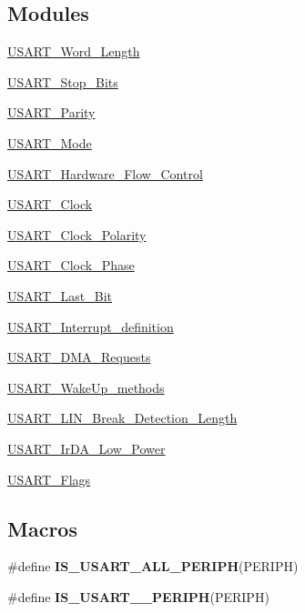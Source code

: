 \subsection*{Modules}
\begin{DoxyCompactItemize}
\item 
\hyperlink{group___u_s_a_r_t___word___length}{U\+S\+A\+R\+T\+\_\+\+Word\+\_\+\+Length}
\item 
\hyperlink{group___u_s_a_r_t___stop___bits}{U\+S\+A\+R\+T\+\_\+\+Stop\+\_\+\+Bits}
\item 
\hyperlink{group___u_s_a_r_t___parity}{U\+S\+A\+R\+T\+\_\+\+Parity}
\item 
\hyperlink{group___u_s_a_r_t___mode}{U\+S\+A\+R\+T\+\_\+\+Mode}
\item 
\hyperlink{group___u_s_a_r_t___hardware___flow___control}{U\+S\+A\+R\+T\+\_\+\+Hardware\+\_\+\+Flow\+\_\+\+Control}
\item 
\hyperlink{group___u_s_a_r_t___clock}{U\+S\+A\+R\+T\+\_\+\+Clock}
\item 
\hyperlink{group___u_s_a_r_t___clock___polarity}{U\+S\+A\+R\+T\+\_\+\+Clock\+\_\+\+Polarity}
\item 
\hyperlink{group___u_s_a_r_t___clock___phase}{U\+S\+A\+R\+T\+\_\+\+Clock\+\_\+\+Phase}
\item 
\hyperlink{group___u_s_a_r_t___last___bit}{U\+S\+A\+R\+T\+\_\+\+Last\+\_\+\+Bit}
\item 
\hyperlink{group___u_s_a_r_t___interrupt__definition}{U\+S\+A\+R\+T\+\_\+\+Interrupt\+\_\+definition}
\item 
\hyperlink{group___u_s_a_r_t___d_m_a___requests}{U\+S\+A\+R\+T\+\_\+\+D\+M\+A\+\_\+\+Requests}
\item 
\hyperlink{group___u_s_a_r_t___wake_up__methods}{U\+S\+A\+R\+T\+\_\+\+Wake\+Up\+\_\+methods}
\item 
\hyperlink{group___u_s_a_r_t___l_i_n___break___detection___length}{U\+S\+A\+R\+T\+\_\+\+L\+I\+N\+\_\+\+Break\+\_\+\+Detection\+\_\+\+Length}
\item 
\hyperlink{group___u_s_a_r_t___ir_d_a___low___power}{U\+S\+A\+R\+T\+\_\+\+Ir\+D\+A\+\_\+\+Low\+\_\+\+Power}
\item 
\hyperlink{group___u_s_a_r_t___flags}{U\+S\+A\+R\+T\+\_\+\+Flags}
\end{DoxyCompactItemize}
\subsection*{Macros}
\begin{DoxyCompactItemize}
\item 
\#define {\bfseries I\+S\+\_\+\+U\+S\+A\+R\+T\+\_\+\+A\+L\+L\+\_\+\+P\+E\+R\+I\+PH}(P\+E\+R\+I\+PH)
\item 
\#define {\bfseries I\+S\+\_\+\+U\+S\+A\+R\+T\+\_\+\_\+\+P\+E\+R\+I\+PH}(P\+E\+R\+I\+PH)
\end{DoxyCompactItemize}


